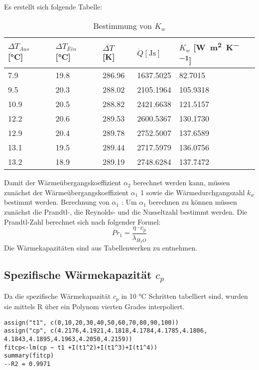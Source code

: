 \documentclass[12pt]{article}
\begin{document}
 Es erstellt sich folgende Tabelle:
 \begin{table}[ht!]
  \centering
 \begin{tabularx}{\textwidth}{XXXXX}
 $\Delta T _{Aus}$ [\si{\celsius}] &  $ \Delta T _{Ein}$ [\si{\celsius}] & $\overline{\Delta T}$ [\si{\kelvin}]
 & $\dot Q [\si{\joule\second}] $ & $ K _w$ [\si{\watt\per\square\meter\per\kelvin}] \\
\hline

 7.9  & 19.8 & 286.96 & 1637.5025 & 82.7015  \\
 9.5  & 20.3 & 288.02 & 2105.1964 & 105.9318 \\

 10.9 & 20.5 & 288.82 & 2421.6638 & 121.5157 \\
 12.2 & 20.6 & 289.53 & 2600.5367 & 130.1730 \\

 12.9 & 20.4 & 289.78 & 2752.5007 & 137.6589 \\
 13.1 & 19.5 & 289.44 & 2717.5979 & 136.0756 \\

 13.2 & 18.9 & 289.19 & 2748.6284 & 137.7472 \\
\end{tabularx}
  \caption{Bestimmung von $K _w$}
\end{table}

Damit der Wärmeübergangskoeffizient $\alpha _2$  berechnet werden kann, müssen zunächst der
Wärmeübergangskoeffizient $\alpha _1$ 1 sowie die Wärmedurchgangszahl $k _w$ bestimmt werden.
Berechnung von $\alpha _1$ :
Um $\alpha _1$  berechnen zu können müssen zunächst die Prandtl-, die Reynolds- und die
Nusseltzahl bestimmt werden.
Die Prandtl-Zahl berechnet sich nach folgender Formel:
\begin{equation}
  Pr_1 = \frac{\eta \cdot c _p}{\lambda _{H_2O}}
\end{equation}
Die Wärmekapazitäten sind aus Tabellenwerken zu entnehmen.
\subsection{Spezifische Wärmekapazität $c _p$}
Da die spezifische Wärmekapazität $c _p$ \cite{crc1} in 10 \si{\celsius} Schritten
tabelliert sind, wurden sie mittels R über ein Polynom vierten Grades interpoliert.
\lstset{ basicstyle=\small, stringstyle=\ttfamily}
\begin{lstlisting}
assign("t1", c(0,10,20,30,40,50,60,70,80,90,100))
assign("cp", c(4.2176,4.1921,4.1818,4.1784,4.1785,4.1806,
4.1843,4.1895,4.1963,4.2050,4.2159))
fitcp<-lm(cp ~ t1 +I(t1^2)+I(t1^3)+I(t1^4))
summary(fitcp)
--R2 = 0.9971
\end{lstlisting}
\end{document}
